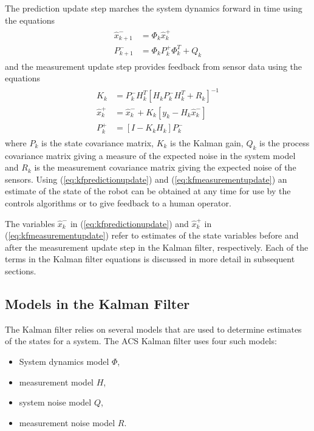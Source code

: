The prediction update step marches the system dynamics forward in time using the equations
\begin{align}
\label{eq:kfpredictionupdate}
\begin{split}
\hat{x}_{k+1}^- &= \Phi_k\hat{x}_k^+ \\
P_{k+1}^- &= \Phi_kP_k^+\Phi_k^T + Q_k
\end{split}
\end{align}
and the measurement update step provides feedback from sensor data using the equations
\begin{align}
\label{eq:kfmeasurementupdate}
\begin{split}
K_k &= P_k^-H_k^T\left[H_kP_k^-H_k^T + R_k\right]^{-1} \\
\hat{x}_k^+ &= \hat{x}_k^- + K_k\left[y_k - H_k\hat{x}_k^-\right] \\
P_k^+ &= \left[I - K_kH_k\right]P_k^-
\end{split}
\end{align}
where $P_k$ is the state covariance matrix, $K_k$ is the Kalman gain, $Q_k$ is the process covariance matrix giving a measure of the expected noise in the system model and $R_k$ is the measurement covariance matrix giving the expected noise of the sensors. Using (\ref{eq:kfpredictionupdate}) and (\ref{eq:kfmeasurementupdate}) an estimate of the state of the robot can be obtained at any time for use by the controls algorithms or to give feedback to a human operator.

The variables $\hat{x}_k^-$ in (\ref{eq:kfpredictionupdate}) and $\hat{x}_k^+$ in (\ref{eq:kfmeasurementupdate}) refer to estimates of the state variables before and after the measurement update step in the Kalman filter, respectively. Each of the terms in the Kalman filter equations is discussed in more detail in subsequent sections.

\subsection{Models in the Kalman Filter}
\label{sec:kfModels}
The Kalman filter relies on several models that are used to determine estimates of the states for a system. The ACS Kalman filter uses four such models:
\begin{itemize}
\item System dynamics model $\Phi$,
\item measurement model $H$,
\item system noise model $Q$,
\item measurement noise model $R$.
\end{itemize}

